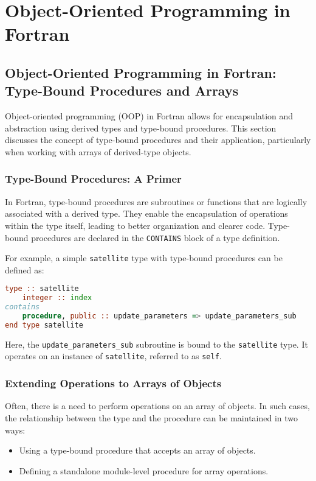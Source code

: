 \chapter{Object-Oriented Programming in Fortran}

\section{Object-Oriented Programming in Fortran: Type-Bound Procedures and Arrays}

Object-oriented programming (OOP) in Fortran allows for encapsulation and abstraction using derived types and type-bound procedures. This section discusses the concept of type-bound procedures and their application, particularly when working with arrays of derived-type objects.

\subsection{Type-Bound Procedures: A Primer}

In Fortran, type-bound procedures are subroutines or functions that are logically associated with a derived type. They enable the encapsulation of operations within the type itself, leading to better organization and clearer code. Type-bound procedures are declared in the \texttt{CONTAINS} block of a type definition.

For example, a simple \texttt{satellite} type with type-bound procedures can be defined as:
\begin{lstlisting}[language=Fortran]
type :: satellite
    integer :: index
contains
    procedure, public :: update_parameters => update_parameters_sub
end type satellite
\end{lstlisting}

Here, the \texttt{update\_parameters\_sub} subroutine is bound to the \texttt{satellite} type. It operates on an instance of \texttt{satellite}, referred to as \texttt{self}.

\subsection{Extending Operations to Arrays of Objects}

Often, there is a need to perform operations on an array of objects. In such cases, the relationship between the type and the procedure can be maintained in two ways:
\begin{itemize}
    \item Using a type-bound procedure that accepts an array of objects.
    \item Defining a standalone module-level procedure for array operations.
\end{itemize}


